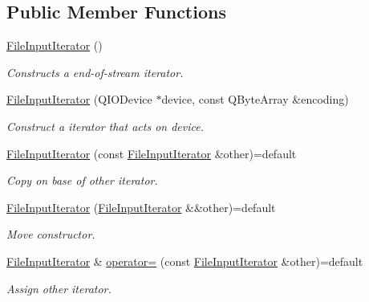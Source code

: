 \subsection*{Public Member Functions}
\begin{DoxyCompactItemize}
\item 
\hyperlink{struct_mdt_1_1_plain_text_1_1_file_input_iterator_a53ed659924fc406bd89c6c6f04018159}{File\+Input\+Iterator} ()
\begin{DoxyCompactList}\small\item\em Constructs a end-\/of-\/stream iterator. \end{DoxyCompactList}\item 
\hyperlink{struct_mdt_1_1_plain_text_1_1_file_input_iterator_ad34d8fff6203f66a4e78283c30079a8f}{File\+Input\+Iterator} (Q\+I\+O\+Device $\ast$device, const Q\+Byte\+Array \&encoding)
\begin{DoxyCompactList}\small\item\em Construct a iterator that acts on device. \end{DoxyCompactList}\item 
\hyperlink{struct_mdt_1_1_plain_text_1_1_file_input_iterator_a7cba55a1d994d46dcddd36dcbf79381b}{File\+Input\+Iterator} (const \hyperlink{struct_mdt_1_1_plain_text_1_1_file_input_iterator}{File\+Input\+Iterator} \&other)=default
\begin{DoxyCompactList}\small\item\em Copy on base of other iterator. \end{DoxyCompactList}\item 
\hyperlink{struct_mdt_1_1_plain_text_1_1_file_input_iterator_aa3921f03022ead216ef23e27aae1ea69}{File\+Input\+Iterator} (\hyperlink{struct_mdt_1_1_plain_text_1_1_file_input_iterator}{File\+Input\+Iterator} \&\&other)=default
\begin{DoxyCompactList}\small\item\em Move constructor. \end{DoxyCompactList}\item 
\hyperlink{struct_mdt_1_1_plain_text_1_1_file_input_iterator}{File\+Input\+Iterator} \& \hyperlink{struct_mdt_1_1_plain_text_1_1_file_input_iterator_adc29c4e6d155d676ca78d1f5ab8032f0}{operator=} (const \hyperlink{struct_mdt_1_1_plain_text_1_1_file_input_iterator}{File\+Input\+Iterator} \&other)=default
\begin{DoxyCompactList}\small\item\em Assign other iterator. \end{DoxyCompactList}\item 

\end{DoxyCompactItemize}
